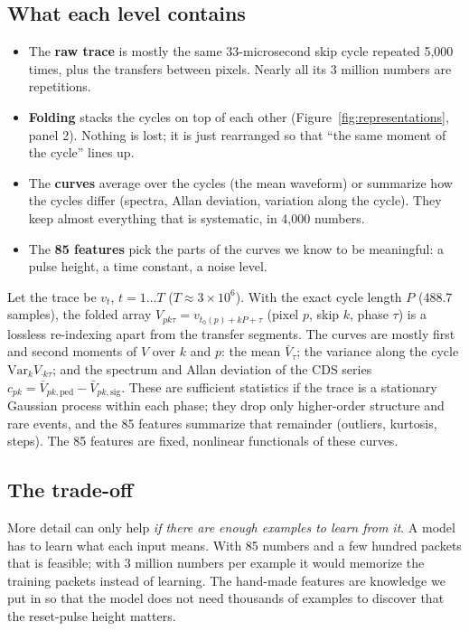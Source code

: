 \documentclass[10pt]{article}
\begin{document}
\subsection{What each level contains}
\begin{basic}
\begin{itemize}
\item The \textbf{raw trace} is mostly the same 33-microsecond skip cycle repeated 5{,}000 times, plus the transfers between pixels.
  Nearly all its 3 million numbers are repetitions.
\item \textbf{Folding} stacks the cycles on top of each other (Figure~\ref{fig:representations}, panel 2). Nothing is lost; it is just
  rearranged so that ``the same moment of the cycle'' lines up.
\item The \textbf{curves} average over the cycles (the mean waveform) or summarize how the cycles differ (spectra, Allan deviation,
  variation along the cycle). They keep almost everything that is systematic, in 4{,}000 numbers.
\item The \textbf{85 features} pick the parts of the curves we know to be meaningful: a pulse height, a time constant, a noise level.
\end{itemize}
\end{basic}

\begin{advanced}
Let the trace be $v_t$, $t = 1\dots T$ ($T \approx 3\times10^6$). With the exact cycle length $P$ (488.7 samples), the folded
array $V_{pk\tau} = v_{t_0(p) + kP + \tau}$ (pixel $p$, skip $k$, phase $\tau$) is a lossless re-indexing apart from the transfer
segments. The curves are mostly first and second moments of $V$ over $k$ and $p$: the mean $\bar V_\tau$; the variance along the
cycle $\mathrm{Var}_k V_{\cdot k\tau}$; and the spectrum and Allan deviation of the CDS series
$c_{pk} = \bar V_{pk,\text{ped}} - \bar V_{pk,\text{sig}}$. These are sufficient statistics if the trace is a stationary Gaussian
process within each phase; they drop only higher-order structure and rare events, and the 85 features summarize that remainder (outliers,
kurtosis, steps). The 85 features are fixed, nonlinear functionals of these curves.
\end{advanced}

\subsection{The trade-off}
\begin{basic}
More detail can only help \emph{if there are enough examples to learn from it}. A model has to learn what each input means. With
85 numbers and a few hundred packets that is feasible; with 3 million numbers per example it would memorize the training packets
instead of learning. The hand-made features are knowledge we put in so that the model does not need thousands of examples to discover
that the reset-pulse height matters.
\end{basic}
\end{document}
